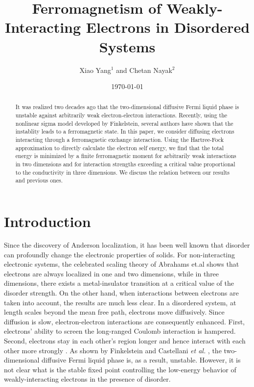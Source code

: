 \documentclass[prb,twocolumn]{revtex4}
\begin{document}
\title{Ferromagnetism of Weakly-Interacting Electrons in Disordered Systems}

\author{Xiao Yang$^1$ and Chetan Nayak$^2$}


\date{\today}


\begin{abstract}
It was realized two decades ago that the two-dimensional diffusive
Fermi liquid phase is unstable against arbitrarily weak
electron-electron interactions.
Recently, using the nonlinear sigma model developed by
Finkelstein, several authors have shown
that the instablity leads to a ferromagnetic state. In this
paper, we consider diffusing electrons interacting through
a ferromagnetic exchange interaction.
Using the Hartree-Fock
approximation to directly calculate the electron self
energy, we find that the total energy is
minimized by a finite ferromagnetic moment
for arbitrarily weak interactions in two dimensions
and for interaction strengths exceeding a critical
value proportional to the conductivity in three dimensions.
We discuss the relation between our results and previous ones.
\end{abstract}

\maketitle

\section{Introduction}
Since the discovery of Anderson localization, it has been well
known that disorder can profoundly change the electronic properties
of solids. For non-interacting electronic systems, the celebrated scaling
theory of Abrahams et.al \cite{Abrahams} shows that
electrons are always localized in one and two dimensions, while in
three dimensions, there exists a metal-insulator transition at
a critical value of the disorder strength. On the other hand, when interactions
between electrons are taken into account, the results are much
less clear. In a disordered system, at length scales beyond the
mean free path, electrons move diffusively. Since diffusion is
slow, electron-electron interactions are consequently enhanced.
First, electrons' ability to screen the long-ranged Coulomb interaction
is hampered. Second, electrons stay in each
other's region longer and hence interact with each other more
strongly \cite{Altshuler}. As shown by Finkelstein \cite{Finkelstein} and
Castellani {\it et al.} \cite{Castellani}, the two-dimensional
diffusive Fermi liquid phase is, as a result, unstable. However, it is
not clear what is the stable fixed point controlling the low-energy behavior
of weakly-interacting electrons in the presence of disorder.
\end{document}
